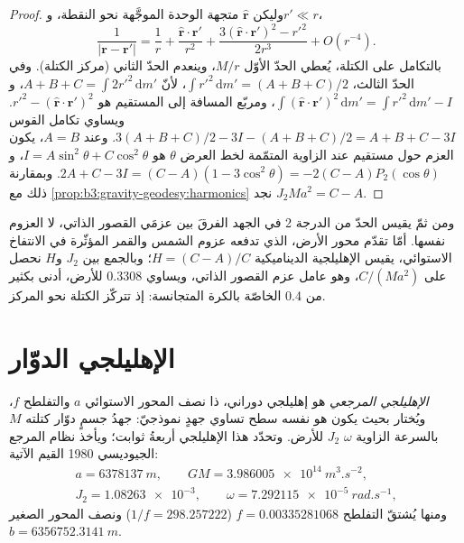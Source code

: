 \begin{proof}
وليكن $\hat{\mathbf r}$ متجهة الوحدة الموجَّهة نحو النقطة، و$r' \ll r$،
\[
  \frac{1}{|\mathbf r - \mathbf r'|} = \frac1r + \frac{\hat{\mathbf r}\cdot\mathbf r'}{r^2}
  + \frac{3(\hat{\mathbf r}\cdot\mathbf r')^2 - r'^2}{2r^3} + O(r^{-4}).
\]
بالتكامل على الكتلة، يُعطي الحدّ الأوّل $M/r$، وينعدم الحدّ الثاني
(مركز الكتلة). وفي الحدّ الثالث، $\int r'^2\,\mathrm dm' = (A + B + C)/2$، لأنّ
$A + B + C = \int 2r'^2\,\mathrm dm'$، و$\int(\hat{\mathbf r}\cdot\mathbf
r')^2\,\mathrm dm' = \int r'^2\,\mathrm dm' - I$، ومربّع المسافة إلى
المستقيم هو $r'^2 - (\hat{\mathbf r}\cdot\mathbf r')^2$. ويساوي تكامل القوس
$3(A + B + C)/2 - 3I - (A + B + C)/2 = A + B + C - 3I$. وعند $A = B$، يكون العزم
حول مستقيم عند الزاوية المتمّمة لخط العرض $\theta$ هو $I = A\sin^2\theta + C\cos^2\theta$،
و$2A + C - 3I = (C - A)(1 - 3\cos^2\theta) = -2(C - A)P_2(\cos\theta)$.
وبمقارنة ذلك مع \cref{prop:b3:gravity-geodesy:harmonics} نجد
$J_2Ma^2 = C - A$.
\end{proof}

ومن ثمّ يقيس الحدّ من الدرجة 2 في الجهد الفرقَ بين
عزمَي القصور الذاتي، لا العزوم نفسها. أمّا تقدّم محور الأرض،
الذي تدفعه عزوم الشمس والقمر المؤثّرة في الانتفاخ الاستوائي،
يقيس الإهليلجية الديناميكية $H = (C - A)/C$؛ وبالجمع بين $J_2$ و$H$ نحصل على
$C/(Ma^2)$، وهو عامل عزم القصور الذاتي، ويساوي \num{0.3308} للأرض،
أدنى بكثير من \num{0.4} الخاصّة بالكرة المتجانسة: إذ تتركّز الكتلة نحو
المركز.

\section{الإهليلجي الدوّار}

\begin{definition}\label{def:b3:gravity-geodesy:ellipsoid}
\emph{الإهليلجي المرجعي} هو إهليلجي دوراني،
ذا نصف المحور الاستوائي $a$ والتفلطح $f$، ويُختار بحيث يكون
هو نفسه سطح تساوي جهدٍ نموذجيّ: جهدُ جسمٍ دوّار
كتلته $M$ بالسرعة الزاوية $\omega$ 
$J_2$ للأرض. وتحدّد هذا الإهليلجي أربعةُ ثوابت؛ ويأخذ نظام المرجع الجيوديسي
1980 القيم الآتية:
\begin{gather*}
  a = \qty{6378137}{m},\qquad GM = \qty{3.986005e14}{m^3.s^{-2}},\\
  J_2 = \num{1.08263e-3},\qquad \omega = \qty{7.292115e-5}{rad.s^{-1}},
\end{gather*}
ومنها يُشتقّ التفلطح $f = \num{0.00335281068}$
($1/f = \num{298.257222}$) ونصف المحور الصغير
$b = \qty{6356752.3141}{m}$.
\end{definition}

